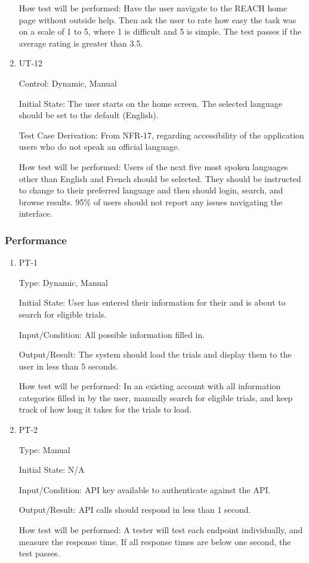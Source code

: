 \documentclass[12pt, titlepage]{article}
\begin{document}
\begin{enumerate}
How test will be performed: Have the user navigate to the REACH home page without outside help. Then ask the user to 
rate how easy the task was on a scale of 1 to 5, where 1 is difficult and 5 is simple. The test passes if the average 
rating is greater than 3.5.

\item{UT-12}

Control: Dynamic, Manual
					
Initial State: The user starts on the home screen. The selected language should be set to the default (English).

Test Case Derivation: From NFR-17, regarding accessibility of the application users who do not speak an official language.

How test will be performed: Users of the next five most spoken languages other than English and French should be selected. They should be instructed to change to their preferred language and then should login, search, and browse results. 95\% of users should not report any issues navigating the interface.


\end{enumerate}

\subsubsection{Performance}
		
\begin{enumerate}

\item{PT-1\\}

Type: Dynamic, Manual
					
Initial State: User has entered their information for their and is about to search for eligible trials.
					
Input/Condition: All possible information filled in.
					
Output/Result: The system should load the trials and display them to the user in less than 5 seconds.
					
How test will be performed: In an existing account with all information categories filled in by the user, manually search for eligible trials, 
and keep track of how long it takes for the trials to load.
					
\item{PT-2\\}

Type:  Manual
					
Initial State: N/A
					
Input/Condition: API key available to authenticate against the API.
					
Output/Result: API calls should respond in less than 1 second.
					
How test will be performed: A tester will test each endpoint individually, and measure the response time. If all response times are below one second, the test passes.

\end{enumerate}
\end{document}
